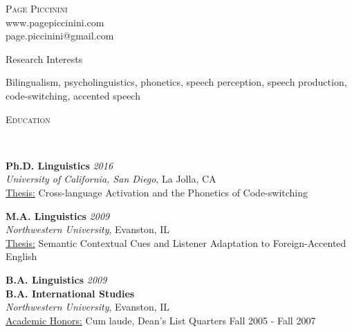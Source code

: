 \documentclass[9pt]{article}
\newenvironment{changemargin}[2]{%
  \begin{list}{}{%
    \setlength{\topsep}{0pt}%
    \setlength{\leftmargin}{#1}%
    \setlength{\rightmargin}{#2}%
    \setlength{\listparindent}{\parindent}%
    \setlength{\itemindent}{\parindent}%
    \setlength{\parsep}{\parskip}%
  }%
  \item[]}{\end{list}
}
\newcommand{\lineover}{
	\begin{changemargin}{-0.05in}{-0.05in}
		\vspace*{-8pt}
		\hrulefill \\
		\vspace*{-2pt}
	\end{changemargin}
}
\newcommand{\header}[1]{
	\begin{changemargin}{-0.5in}{-0.5in}
		\scshape{#1}\\
  	\lineover
	\end{changemargin}
}
\newcommand{\contact}[4]{
	\begin{changemargin}{-0.5in}{-0.5in}
		\begin{center}
			{\Large \scshape {#1}}\\ \smallskip
			{#2}\\ \smallskip 
			{#3}\\ \smallskip
			{#4}\smallskip
		\end{center}
	\end{changemargin}
}
\newenvironment{body} {
	\vspace*{-16pt}
	\begin{changemargin}{-0.25in}{-0.5in}
  }	
	{\end{changemargin}
}
\begin{document}
\contact{Page Piccinini}{www.pagepiccinini.com}{page.piccinini@gmail.com}






\header{Research Interests}

\begin{body}
	\vspace{14pt}
	Bilingualism, psycholinguistics, phonetics, speech perception, speech production, code-switching, accented speech
\end{body}

\smallskip


\header{Education}

\begin{body}
	\vspace{14pt}
	\textbf{Ph.D. Linguistics} \hfill \emph{2016} \\
	\emph{University of California, San Diego}, La Jolla, CA \\
	\underline{Thesis:} Cross-language Activation and the Phonetics of Code-switching\\
  \medskip

	\textbf{M.A. Linguistics} \hfill \emph{2009} \\
	\emph{Northwestern University}, Evanston, IL\\
	\underline{Thesis:} Semantic Contextual Cues and Listener Adaptation to Foreign-Accented English\\
  \medskip

	\textbf{B.A. Linguistics} \hfill \emph{2009} \\
	\textbf{B.A. International Studies} \\
	\emph{Northwestern University}, Evanston, IL\\
	\underline{Academic Honors:} Cum laude, Dean's List Quarters Fall 2005 - Fall 2007\\

\end{body}
\end{document}
